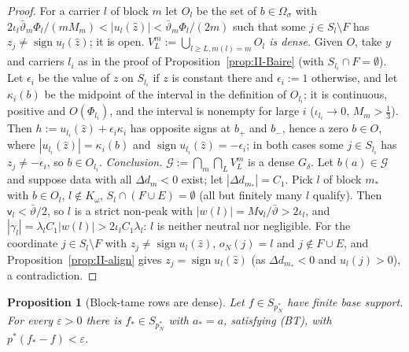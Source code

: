 \documentclass[10pt]{amsart}
\newtheorem{proposition}[theorem]{Proposition}
\theoremstyle{definition}
\theoremstyle{remark}
\newcommand{\sgn}{\operatorname{sign}}
\newcommand{\zh}{\hat z}
\begin{document}
\begin{proof}
For a carrier $l$ of block $m$ let $O_l$ be the set of $b\in\Omega_\sigma$ with
$2\iota_l\bar\vartheta_m\Phi_l/(mM_m)<|u_l(\zh)|<\bar\vartheta_m\Phi_l/(2m)$ such that some
$j\in S_l\setminus F$ has $z_j\ne\sgn u_l(\zh)$; it is open.  \emph{$V^m_L:=
\bigcup_{l\ge L,m(l)=m}O_l$ is dense.}  Given $O$, take $y$ and carriers $l_i$ as in
the proof of Proposition~\ref{prop:II-Baire} (with $S_{l_i}\cap F=\emptyset$).  Let
$\epsilon_i$ be the value of $z$ on $S_{l_i}$ if $z$ is constant there and $\epsilon_i:=1$
otherwise, and let $\kappa_i(b)$ be the midpoint of the interval in the
definition of $O_{l_i}$; it is continuous, positive and $O(\Phi_{l_i})$, and the
interval is nonempty for large $i$ ($\iota_{l_i}\to0$, $M_m>\frac13$).  Then
$h:=u_{l_i}(\zh)+\epsilon_i\kappa_i$ has opposite signs at $b_+$ and $b_-$, hence a
zero $b\in O$, where $|u_{l_i}(\zh)|=\kappa_i(b)$ and $\sgn u_{l_i}(\zh)=-\epsilon_i$; in
both cases some $j\in S_{l_i}$ has $z_j\ne-\epsilon_i$, so $b\in O_{l_i}$.
\emph{Conclusion.}  $\mathcal G:=\bigcap_m\bigcap_LV^m_L$ is a dense $G_\delta$.  Let
$b(a)\in\mathcal G$ and suppose data with all $\Delta d_m<0$ exist; let
$|\Delta d_{m_*}|=C_1$.  Pick $l$ of block $m_*$ with $b\in O_l$, $l\notin K_\omega$,
$S_l\cap(F\cup E)=\emptyset$ (all but finitely many $l$ qualify).  Then $\mathsf
v_l<\bar\vartheta/2$, so $l$ is a strict non-peak with $|w(l)|=M\mathsf v_l/\bar\vartheta>
2\iota_l$, and $|\gamma_l|=\lambda_lC_1|w(l)|>2\iota_lC_1\lambda_l$: $l$ is neither neutral
nor negligible.  For the coordinate $j\in S_l\setminus F$ with $z_j\ne\sgn u_l(\zh)$,
$o_N(j)=l$ and $j\notin F\cup E$, and Proposition~\ref{prop:II-align} gives $z_j=
\sgn u_l(\zh)$ (as $\Delta d_{m_*}<0$ and $u_l(j)>0$), a contradiction.
\end{proof}

\begin{proposition}[Block-tame rows are dense]\label{prop:II-BTdense}
Let $f\in S_{p_N^*}$ have finite base support.  For every $\varepsilon>0$ there is
$f_*\in S_{p_N^*}$ with $a_*=a$, satisfying \textup{(BT)}, with $p^*(f_*-f)<
\varepsilon$.
\end{proposition}
\end{document}
